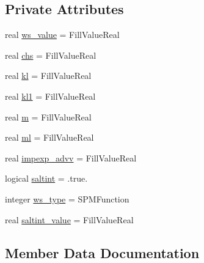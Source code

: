 \subsection*{Private Attributes}
\begin{DoxyCompactItemize}
\item 
real \mbox{\hyperlink{structmodulewaterproperties_1_1t__freeverticalmovparameters_ac0d004f7073093c6591ec931b1fbb0ef}{ws\+\_\+value}} = Fill\+Value\+Real
\item 
real \mbox{\hyperlink{structmodulewaterproperties_1_1t__freeverticalmovparameters_ac2c7528fce232ceedc807e4c70ba0158}{chs}} = Fill\+Value\+Real
\item 
real \mbox{\hyperlink{structmodulewaterproperties_1_1t__freeverticalmovparameters_ac6ea6078723f98e415e4c798252c82f6}{kl}} = Fill\+Value\+Real
\item 
real \mbox{\hyperlink{structmodulewaterproperties_1_1t__freeverticalmovparameters_a6c1958ab8e67afb94e80a3cb6131d35e}{kl1}} = Fill\+Value\+Real
\item 
real \mbox{\hyperlink{structmodulewaterproperties_1_1t__freeverticalmovparameters_a4e0637aa5f792e0c947cc579e41534b7}{m}} = Fill\+Value\+Real
\item 
real \mbox{\hyperlink{structmodulewaterproperties_1_1t__freeverticalmovparameters_a3747340ffa90df18d6770db70d08130f}{ml}} = Fill\+Value\+Real
\item 
real \mbox{\hyperlink{structmodulewaterproperties_1_1t__freeverticalmovparameters_ac146f971c70bf47c5e2c6a680a20619d}{impexp\+\_\+advv}} = Fill\+Value\+Real
\item 
logical \mbox{\hyperlink{structmodulewaterproperties_1_1t__freeverticalmovparameters_af0bb850478d513627a1d4470d2a4c402}{saltint}} = .true.
\item 
integer \mbox{\hyperlink{structmodulewaterproperties_1_1t__freeverticalmovparameters_a5d355dab566028f038ae6b80bfcee359}{ws\+\_\+type}} = S\+P\+M\+Function
\item 
real \mbox{\hyperlink{structmodulewaterproperties_1_1t__freeverticalmovparameters_a4534e293380ce40c3d3a12f41572a0e0}{saltint\+\_\+value}} = Fill\+Value\+Real
\end{DoxyCompactItemize}


\subsection{Member Data Documentation}
\mbox{\label{structmodulewaterproperties_1_1t__freeverticalmovparameters_ac2c7528fce232ceedc807e4c70ba0158}} 
